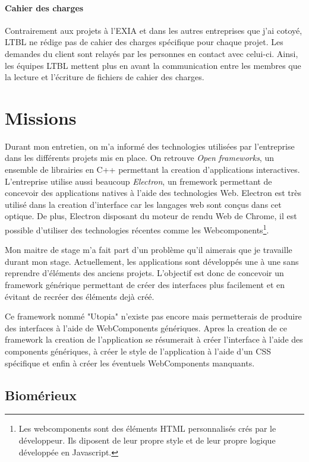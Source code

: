 \documentclass{article}
\begin{document}
\paragraph{Cahier des charges} Contrairement aux projets à l'EXIA et dans les autres entreprises que j'ai cotoyé, LTBL ne rédige pas de cahier des charges spécifique pour chaque projet.
Les demandes du client sont relayés par les personnes en contact avec celui-ci.
Ainsi, les équipes LTBL mettent plus en avant la communication entre les membres que la lecture et l'écriture de fichiers de cahier des charges.

\section{Missions}

Durant mon entretien, on m'a informé des technologies utilisées par l'entreprise dans les différents projets mis en place.
On retrouve \emph{Open frameworks}, un ensemble de librairies en C++ permettant la creation d'applications interactives.
L'entreprise utilise aussi beaucoup \emph{Electron}, un fremework permettant de concevoir des applications natives à l'aide des technologies Web.
Electron est très utilisé dans la creation d'interface car les langages web sont conçus dans cet optique.
De plus, Electron disposant du moteur de rendu Web de Chrome, il est possible d'utiliser des technologies récentes comme les Webcomponents\footnote{Les webcomponents sont des éléments HTML personnalisés crés par le développeur. Ils diposent de leur propre style et de leur propre logique développée en Javascript.}.

Mon maitre de stage m'a fait part d'un problème qu'il aimerais que je travaille durant mon stage.
Actuellement, les applications sont développés une à une sans reprendre d'éléments des anciens projets.
L'objectif est donc de concevoir un framework générique permettant de créer des interfaces plus facilement et en évitant de recréer des éléments dejà créé.

Ce framework nommé "Utopia" n'existe pas encore mais permetterais de produire des interfaces à l'aide de WebComponents génériques.
Apres la creation de ce framework la creation de l'application se résumerait à créer l'interface à l'aide des components génériques, à créer le style de l'application à l'aide d'un CSS spécifique et enfin à créer les éventuels WebComponents manquants.

\subsection{Biomérieux}
\end{document}
